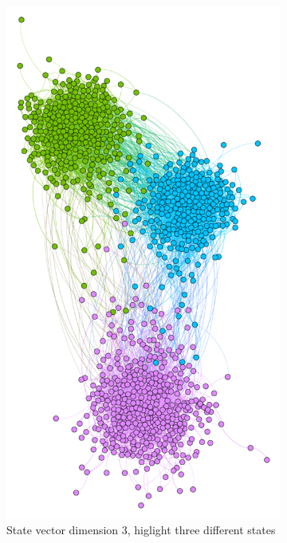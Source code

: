 \begin{figure}
  \centering
  \begin{subfigure}[t]{0.25\textwidth}
    \includegraphics[width=\textwidth]{img/dim3_mod.pdf}
    \caption{State vector dimension 3, higlight
      three different states}
    \label{fig:bubble3mod}
  \end{subfigure}
  ~
  \begin{subfigure}[t]{0.35\textwidth}

\end{subfigure}
\end{figure}
